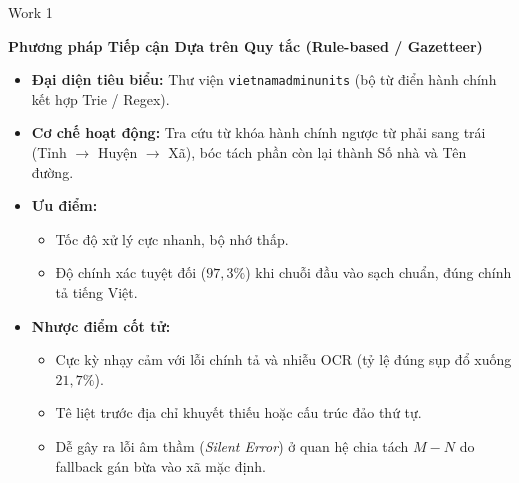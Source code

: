 \documentclass[aspectratio=169,9pt]{beamer}
\begin{document}
\begin{frame}{Work 1}
  \vspace{0.05cm}
  \centerline{\large\textbf{Phương pháp Tiếp cận Dựa trên Quy tắc (Rule-based / Gazetteer)}}
  \vspace{0.2cm}

  \begin{itemize}
    \setlength{\itemsep}{4pt}
    \item \textbf{Đại diện tiêu biểu:} Thư viện \texttt{vietnamadminunits} (bộ từ điển hành chính kết hợp Trie / Regex).
    \item \textbf{Cơ chế hoạt động:} Tra cứu từ khóa hành chính ngược từ phải sang trái (Tỉnh $\to$ Huyện $\to$ Xã), bóc tách phần còn lại thành Số nhà và Tên đường.
    \item \textbf{Ưu điểm:}
      \begin{itemize}
        \setlength{\itemsep}{2pt}
        \item Tốc độ xử lý cực nhanh, bộ nhớ thấp.
        \item Độ chính xác tuyệt đối ($97{,}3\%$) khi chuỗi đầu vào sạch chuẩn, đúng chính tả tiếng Việt.
      \end{itemize}
    \item \textbf{Nhược điểm cốt tử:}
      \begin{itemize}
        \setlength{\itemsep}{2pt}
        \item Cực kỳ nhạy cảm với lỗi chính tả và nhiễu OCR (tỷ lệ đúng sụp đổ xuống $21{,}7\%$).
        \item Tê liệt trước địa chỉ khuyết thiếu hoặc cấu trúc đảo thứ tự.
        \item Dễ gây ra lỗi âm thầm (\textit{Silent Error}) ở quan hệ chia tách $M - N$ do fallback gán bừa vào xã mặc định.
      \end{itemize}
  \end{itemize}
\end{frame}
\end{document}

